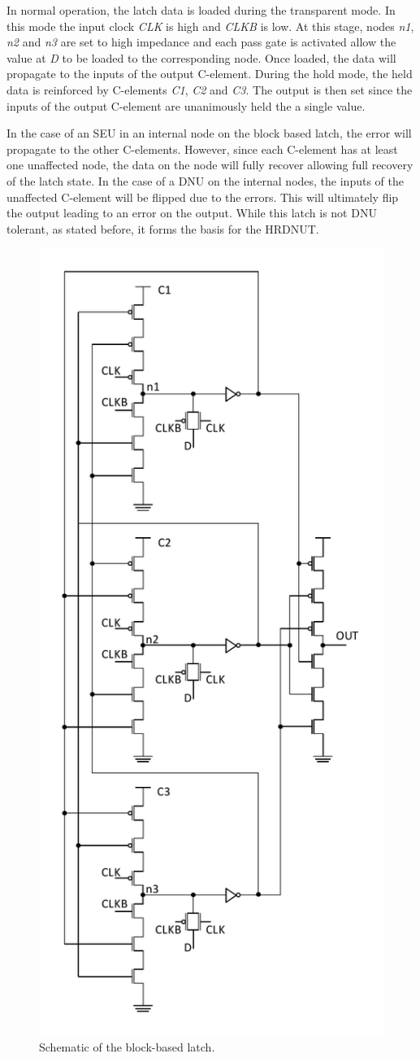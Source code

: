 In normal operation, the latch data is loaded during the transparent mode. In this mode the input clock \textit{CLK} is high and \textit{CLKB} is low. At this stage, nodes \textit{n1}, \textit{n2} and \textit{n3} are set to high impedance and each pass gate is activated allow the value at \textit{D} to be loaded to the corresponding node. Once loaded, the data will propagate to the inputs of the output C-element. During the hold mode, the held data is reinforced by C-elements \textit{C1}, \textit{C2} and \textit{C3}. The output is then set since the inputs of the output C-element are unanimously held the a single value.

In the case of an SEU in an internal node on the block based latch, the error will propagate to the other C-elements. However, since each C-element has at least one unaffected node, the data on the node will fully recover allowing full recovery of the latch state. In the case of a DNU on the internal nodes, the inputs of the unaffected C-element will be flipped due to the errors. This will ultimately flip the output leading to an error on the output. While this latch is not DNU tolerant, as stated before, it forms the basis for the HRDNUT.

\begin{figure}[!htbp]
	\centering
	\includegraphics[width=0.55\linewidth]{Figures/BLatch}
	\caption{Schematic of the block-based latch.}
	\label{BLatch}
\end{figure} 

